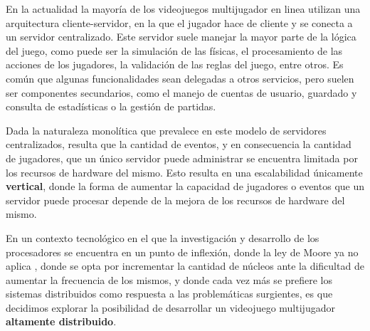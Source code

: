 
\noindent En la actualidad la mayoría de los videojuegos multijugador en linea
utilizan una arquitectura cliente-servidor, en la que el jugador
hace de cliente y se conecta a un servidor centralizado. Este servidor suele manejar
la mayor parte de la lógica del juego, como puede ser la simulación de las físicas, el procesamiento
de las acciones de los jugadores, la validación de las reglas del juego, entre otros.
Es común que algunas funcionalidades sean delegadas a otros servicios, pero suelen ser componentes
secundarios, como el manejo de cuentas de usuario, guardado y consulta de estadísticas
o la gestión de partidas.

Dada la naturaleza monolítica que prevalece en este modelo de servidores centralizados,
resulta que la cantidad de eventos, y en consecuencia la cantidad de jugadores,
que un único servidor puede administrar se encuentra limitada por los recursos de hardware del mismo.
Esto resulta en una escalabilidad únicamente \textbf{vertical}, donde la forma de aumentar la capacidad
de jugadores o eventos que un servidor puede procesar depende de la mejora de los recursos de hardware del mismo.

En un contexto tecnológico en el que la investigación y desarrollo de los procesadores
se encuentra en un punto de inflexión, donde la ley de Moore ya no aplica \cite{moores-law-is-dead},
donde se opta por incrementar la cantidad de núcleos ante la dificultad de aumentar la frecuencia de los mismos,
y donde cada vez más se prefiere los sistemas distribuidos como respuesta a las problemáticas surgientes,
es que decidimos explorar la posibilidad de desarrollar un videojuego multijugador
\textbf{altamente distribuido}.



